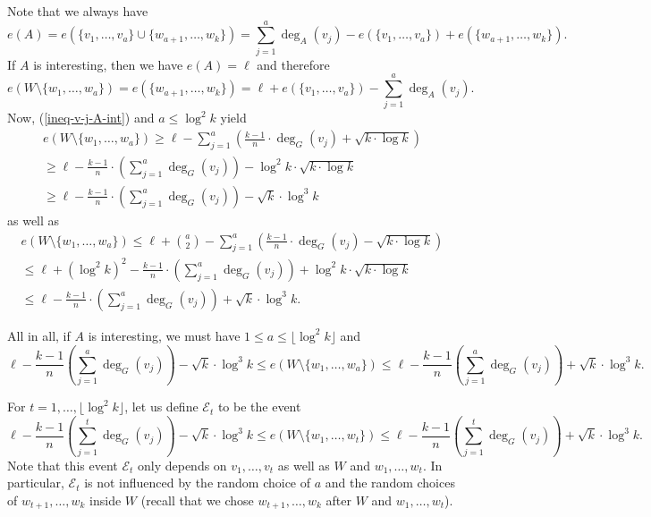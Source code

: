 Note that we always have
\[e(A)=e(\lbrace v_1,\dots,v_a\rbrace\cup \lbrace w_{a+1},\dots,w_k\rbrace)=\sum_{j=1}^{a}\deg_A(v_j)-e(\lbrace v_1,\dots,v_a\rbrace)+e(\lbrace w_{a+1},\dots,w_k\rbrace).\]
If $A$ is interesting, then we have $e(A)=\ell$ and therefore
\[e(W\setminus \lbrace w_{1},\dots,w_a\rbrace)=e(\lbrace w_{a+1},\dots,w_k\rbrace)=\ell+e(\lbrace v_1,\dots,v_a\rbrace)-\sum_{j=1}^{a}\deg_A(v_j).\]
Now, (\ref{ineq-v-j-A-int}) and $a\leq \log^2 k$ yield
\begin{multline*}
e(W\setminus \lbrace w_{1},\dots,w_a\rbrace)\geq \ell-\sum_{j=1}^{a}\left(\frac{k-1}{n}\cdot \deg_G(v_j)+\sqrt{k\cdot \log k}\right)\\
\geq \ell-\frac{k-1}{n}\cdot\left(\sum_{j=1}^{a}\deg_G(v_j)\right)-\log^2 k\cdot \sqrt{k\cdot \log k}\\
\geq \ell-\frac{k-1}{n}\cdot\left(\sum_{j=1}^{a}\deg_G(v_j)\right)-\sqrt{k}\cdot \log^3 k
\end{multline*}
as well as
\begin{multline*}
e(W\setminus \lbrace w_{1},\dots,w_a\rbrace)\leq \ell+{a\choose 2}-\sum_{j=1}^{a}\left(\frac{k-1}{n}\cdot \deg_G(v_j)-\sqrt{k\cdot \log k}\right)\\
\leq \ell+(\log^2 k)^2-\frac{k-1}{n}\cdot\left(\sum_{j=1}^{a}\deg_G(v_j)\right)+\log^2 k\cdot \sqrt{k\cdot \log k}\\
\leq \ell-\frac{k-1}{n}\cdot\left(\sum_{j=1}^{a}\deg_G(v_j)\right)+\sqrt{k}\cdot \log^3 k.
\end{multline*}

All in all, if $A$ is interesting, we must have $1\leq a\leq \lfloor\log^2 k\rfloor$ and
\[ \ell-\frac{k-1}{n}\left(\sum_{j=1}^{a}\deg_G(v_j)\right)-\sqrt{k}\cdot \log^3 k\leq e(W\setminus \lbrace w_{1},\dots,w_a\rbrace)\leq \ell-\frac{k-1}{n}\left(\sum_{j=1}^{a}\deg_G(v_j)\right)+\sqrt{k}\cdot \log^3 k.\]

For $t=1,\dots,\lfloor\log^2 k\rfloor$, let us define $\mathscr{E}_t$ to be the event
\[ \ell-\frac{k-1}{n}\left(\sum_{j=1}^{t}\deg_G(v_j)\right)-\sqrt{k}\cdot \log^3 k\leq e(W\setminus \lbrace w_{1},\dots,w_t\rbrace)\leq \ell-\frac{k-1}{n}\left(\sum_{j=1}^{t}\deg_G(v_j)\right)+\sqrt{k}\cdot \log^3 k.\]
Note that this event $\mathscr{E}_t$ only depends on $v_1,\dots,v_t$ as well as $W$ and $w_1,\dots,w_t$. In particular, $\mathscr{E}_t$ is not influenced by the random choice of $a$ and the random choices of $w_{t+1},\dots,w_k$ inside $W$ (recall that we chose $w_{t+1},\dots,w_k$ after $W$ and $w_1,\dots,w_t$).

